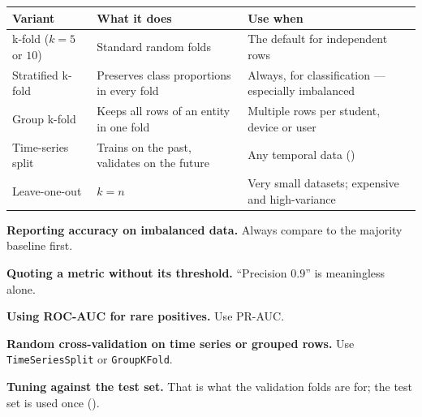 \begin{longtable}{@{}L{3.6cm}L{5.0cm}L{5.9cm}@{}}
\toprule
{}
\textbf{Variant} & \textbf{What it does} & \textbf{Use when} \\
\midrule
\endhead
k-fold ($k=5$ or $10$) & Standard random folds & The default for independent rows \\
Stratified k-fold & Preserves class proportions in every fold & Always, for classification --- especially imbalanced \\
Group k-fold & Keeps all rows of an entity in one fold & Multiple rows per student, device or user \\
Time-series split & Trains on the past, validates on the future & Any temporal data () \\
Leave-one-out & $k = n$ & Very small datasets; expensive and high-variance \\
\bottomrule
\end{longtable}

\begin{pitfall}
\begin{tight}
  \item \textbf{Reporting accuracy on imbalanced data.} Always compare to the
        majority baseline first.
  \item \textbf{Quoting a metric without its threshold.} ``Precision 0.9'' is
        meaningless alone.
  \item \textbf{Using ROC-AUC for rare positives.} Use PR-AUC.
  \item \textbf{Random cross-validation on time series or grouped rows.} Use
        \texttt{TimeSeriesSplit} or \texttt{GroupKFold}.
  \item \textbf{Tuning against the test set.} That is what the validation folds are
        for; the test set is used once ().
\end{tight}
\end{pitfall}

